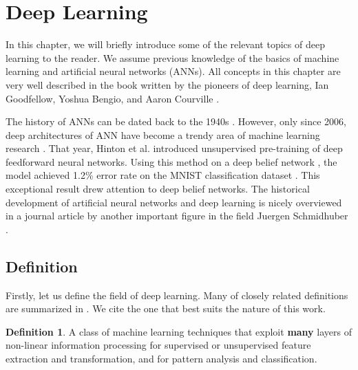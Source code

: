 \section{Deep Learning}\label{deep_learning_chapter}


In this chapter, we will briefly introduce some of the relevant topics of deep learning to the reader. We assume previous knowledge of the basics of machine learning and artificial neural networks (ANNs). All concepts in this chapter are very well described in the book written by the pioneers of deep learning, Ian Goodfellow, Yoshua Bengio, and Aaron Courville \cite{Goodfellow-et-al-2016}. 

The history of ANNs can be dated back to the 1940s \cite{McCulloch_1943}. However, only since 2006, deep architectures of ANN have become a trendy area of machine learning research \cite{DBLP:journals/corr/Schmidhuber14}. That year, Hinton et al. introduced unsupervised pre-training of deep feedforward neural networks. Using this method on a deep belief network \cite{DBN}, the model achieved 1.2\% error rate on the MNIST classification dataset \cite{mnist}. This exceptional result drew attention to deep belief networks. The historical development of artificial neural networks and deep learning is nicely overviewed in a journal article by another important figure in the field Juergen Schmidhuber 
\cite{DBLP:journals/corr/Schmidhuber14}.

\subsection{Definition}
Firstly, let us define the field of deep learning. Many of closely related definitions are summarized in \cite{mic_definitions}. We cite the one that best suits the nature of this work.  
    
\theoremstyle{definition}
\newtheorem*{definition}{Definition}
\begin{definition}
A class of machine learning techniques that exploit \textbf{many} layers of non-linear information processing for supervised or unsupervised feature extraction and transformation, and for pattern analysis and classification.
\end{definition}

